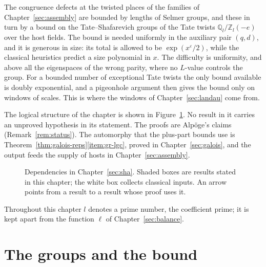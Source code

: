 \documentclass[11pt]{amsbook}
\theoremstyle{plain}
\theoremstyle{definition}
\theoremstyle{remark}
\numberwithin{equation}{section}
\numberwithin{figure}{chapter}
\numberwithin{table}{chapter}
\newcommand{\Q}{\mathbb{Q}}
\newcommand{\Z}{\mathbb{Z}}
\newcommand{\eps}{\varepsilon}
\begin{document}
The congruence defects at the twisted places of the families of
Chapter~\ref{sec:assembly} are bounded by lengths of Selmer groups, and
these in turn by a bound on the Tate--Shafarevich groups of the Tate
twists $\Q_l/\Z_l(-e)$ over the host fields. The bound is needed
uniformly in the auxiliary pair $(q,d)$, and it is generous in size:
its total is allowed to be $\exp(x^\eps/2)$, while the classical
heuristics predict a size polynomial in $x$. The difficulty is
uniformity, and above all the eigenspaces of the wrong parity, where no
$L$-value controls the group. For a bounded number of exceptional Tate
twists the only bound available is doubly exponential, and a pigeonhole
argument then gives the bound only on windows of scales. This is where
the windows of Chapter~\ref{sec:landau} come from.

The logical structure of the chapter is shown in
Figure~\ref{fig:sha-deps}. No result in it carries an unproved
hypothesis in its statement. The proofs are Alp\"oge's claims
(Remark~\ref{rem:status}). The automorphy that the plus-part bounds
use is Theorem~\ref{thm:galois-reps}\ref{item:gr-lgc}, proved in
Chapter~\ref{sec:galois}, and the output feeds the supply of hosts in
Chapter~\ref{sec:assembly}.

\begin{figure}[htbp]
\centering

\caption{Dependencies in Chapter~\ref{sec:sha}. Shaded boxes are
results stated in this chapter; the white box collects classical
inputs. An arrow points from a result to a result whose proof uses
it.}
\label{fig:sha-deps}
\end{figure}

Throughout this chapter $l$ denotes a prime number, the coefficient
prime; it is kept apart from the function $\ell$ of
Chapter~\ref{sec:balance}.

\section{The groups and the bound}
\end{document}
